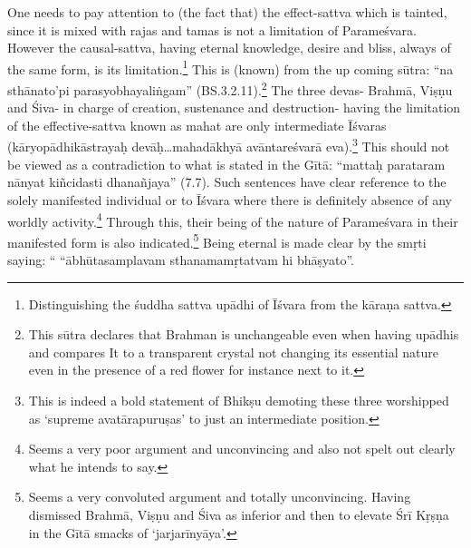 One needs to pay attention to (the fact that) the effect-sattva which is tainted, since it is mixed with rajas and tamas is not a limitation of Parameśvara. However the causal-sattva, having eternal knowledge, desire and bliss, always of the same form, is its limitation.\footnote{Distinguishing the śuddha sattva upādhi of Īśvara from the kāraṇa sattva.} This is (known) from the up coming sūtra: “na sthānato’pi parasyobhayaliṅgam” (BS.3.2.11).\footnote{This sūtra declares that Brahman is unchangeable even when having upādhis and compares It to a transparent crystal not changing its essential nature even in the presence of a red flower for instance next to it.} The three devas- Brahmā, Viṣṇu and Śiva- in charge of creation, sustenance and destruction- having the limitation of the effective-sattva known as mahat are only intermediate Īśvaras (kāryopādhikāstrayaḥ devāḥ…mahadākhyā avāntareśvarā eva).\footnote{This is indeed a bold statement of Bhikṣu demoting these three worshipped as ‘supreme avatārapuruṣas’ to just an intermediate position.} This should not be viewed as a contradiction to what is stated in the Gītā: “mattaḥ parataram nānyat kiñcidasti dhanañjaya” (7.7). Such sentences have clear reference to the solely manifested individual or to Īśvara where there is definitely absence of any worldly activity.\footnote{Seems a very poor argument and unconvincing and also not spelt out clearly what he intends to say.} Through this, their being of the nature of Parameśvara in their manifested form is also indicated.\footnote{Seems a very convoluted argument and totally unconvincing. Having dismissed Brahmā, Viṣṇu and Śiva as inferior and then to elevate Śrī Kṛṣṇa in the Gītā smacks of ‘jarjarīnyāya’.} Being eternal is made clear by the smṛti saying: “ “ābhūtasamplavam sthanamamṛtatvam hi bhāṣyato”.  

